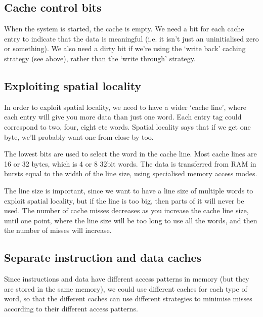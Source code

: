 \subsection{Cache control bits}

When the system is started, the cache is empty. We need a bit for each cache
entry to indicate that the data is meaningful (i.e. it isn't just an uninitialised
zero or something). We also need a dirty bit if we're using the `write back'
caching strategy (see above), rather than the `write through' strategy.

\subsection{Exploiting spatial locality}

In order to exploit spatial locality, we need to have a wider `cache line', where
each entry will give you more data than just one word. Each entry tag could
correspond to two, four, eight etc words. Spatial locality says that if we get
one byte, we'll probably want one from close by too.


The lowest bits are used to select the word in the cache line. Most cache lines
are 16 or 32 bytes, which is 4 or 8 32bit words. The data is transferred from
RAM in bursts equal to the width of the line size, using specialised memory
access modes.


The line size is important, since we want to have a line size of multiple words
to exploit spatial locality, but if the line is too big, then parts of it will
never be used. The number of cache misses decreases as you increase the cache
line size, until one point, where the line size will be too long to use all the
words, and then the number of misses will increase.

\subsection{Separate instruction and data caches}

Since instructions and data have different access patterns in memory (but they
are stored in the same memory), we could use different caches for each type of
word, so that the different caches can use different strategies to minimise
misses according to their different access patterns.

